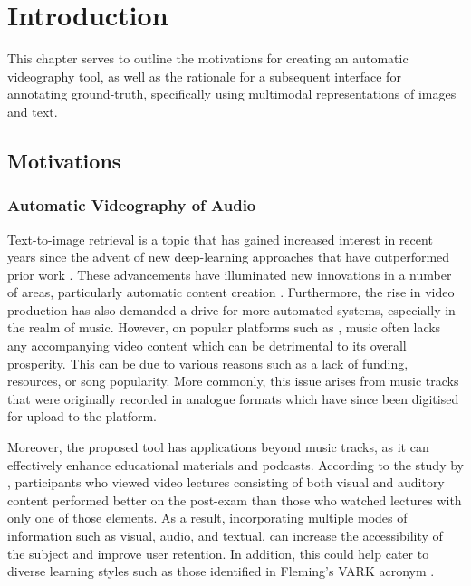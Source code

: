 \documentclass{l4proj}
\begin{document}
\chapter{Introduction}

This chapter serves to outline the motivations for creating an automatic videography tool, as well as the rationale for a subsequent interface for annotating ground-truth, specifically using multimodal representations of images and text. 

\section{Motivations}
\subsection{Automatic Videography of Audio}
Text-to-image retrieval is a topic that has gained increased interest in recent years since the advent of new deep-learning approaches that have outperformed prior work \citep{gordo2017end}. These advancements have illuminated new innovations in a number of areas, particularly automatic content creation \citep{singer2022make}. Furthermore, the rise in video production \citep{tprisevideo} has also demanded a drive for more automated systems, especially in the realm of music. However, on popular platforms such as \cite{youtube}, music often lacks any accompanying video content which can be detrimental to its overall prosperity. This can be due to various reasons such as a lack of funding, resources, or song popularity. More commonly, this issue arises from music tracks that were originally recorded in analogue formats which have since been digitised for upload to the platform.

Moreover, the proposed tool has applications beyond music tracks, as it can effectively enhance educational materials and podcasts. According to the study by \cite{benefits_of_mmv}, participants who viewed video lectures consisting of both visual and auditory content performed better on the post-exam than those who watched lectures with only one of those elements. As a result, incorporating multiple modes of information such as visual, audio, and textual, can increase the accessibility of the subject and improve user retention. In addition, this could help cater to diverse learning styles such as those identified in Fleming's VARK acronym \citep{vark}.
\end{document}

